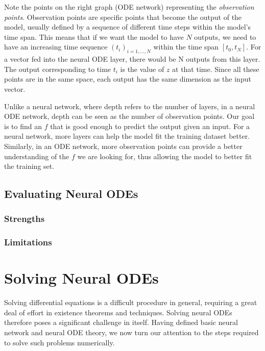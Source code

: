 \documentclass[a4paper,11pt,titlepage]{article}
\theoremstyle{definition}
\theoremstyle{plain}
\theoremstyle{remark}
\begin{document}
Note the points on the right graph (ODE network) representing the \textit{observation points}. Observation points are specific points that become the output of the model, usually defined by a sequence of different time steps within the model's time span. This means that if we want the model to have $N$ outputs, we need to have an increasing time sequence $(t_i)_{i=1,\dots ,N}$ within the time span $[t_0,t_N]$. For a vector fed into the neural ODE layer, there would be N outputs from this layer. The output corresponding to time $t_i$ is the value of $z$ at that time. Since all these points are in the same space, each output has the same dimension as the input vector.

Unlike a neural network, where depth refers to the number of layers, in a neural ODE network, depth can be seen as the number of observation points. Our goal is to find an $f$ that is good enough to predict the output given an input. For a neural network, more layers can help the model fit the training dataset better. Similarly, in an ODE network, more observation points can provide a better understanding of the $f$ we are looking for, thus allowing the model to better fit the training set.

\subsection{Evaluating Neural ODEs}

\subsubsection{Strengths}

\subsubsection{Limitations}

\pagebreak
\section{Solving Neural ODEs}
\label{sec:solvingNODEs}

Solving differential equations is a difficult procedure in general, requiring a great deal of effort in existence theorems and techniques. Solving neural ODEs therefore poses a significant challenge in itself. Having defined basic neural network and neural ODE theory, we now turn our attention to the steps required to solve such problems numerically.
\end{document}

